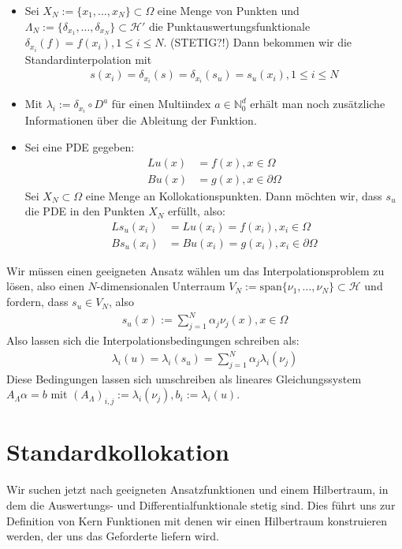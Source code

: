 \begin{example}
\begin{itemize}
\item
Sei $X_N := \{x_1, \dots, x_N\} \subset \Omega$ eine Menge von Punkten und $\Lambda_N := \{\delta_{x_1}, \dots,\delta_{x_N}\} \subset \mathcal{H}'$ die Punktauswertungsfunktionale $\delta_{x_i}(f) = f(x_i), 1\le i \le N$. (STETIG?!) Dann bekommen wir die Standardinterpolation mit
\begin{align*}
s(x_i) = \delta_{x_i}(s) = \delta_{x_i}(s_u) = s_u(x_i), 1\le i \le N
\end{align*}
\item
Mit $\lambda_i := \delta_{x_i} \circ D^a$ für einen Multiindex $a \in \mathbb{N}_0^d$ erhält man noch zusätzliche Informationen über die Ableitung der Funktion.
\item
Sei eine \ac{PDE} gegeben:
\begin{align*}
L u(x) &= f(x), x \in \Omega \\
B u(x) &= g(x), x \in \partial \Omega
\end{align*}
Sei $X_N \subset \Omega$ eine Menge an Kollokationspunkten. Dann möchten wir, dass $s_u$ die \ac{PDE} in den Punkten $X_N$ erfüllt, also:
\begin{align*}
L s_u(x_i) &= L u(x_i) = f(x_i), x_i \in \Omega \\
B s_u(x_i) &= B u(x_i) = g(x_i), x_i \in \partial \Omega
\end{align*}
\end{itemize}
\end{example}

Wir müssen einen geeigneten Ansatz wählen um das Interpolationsproblem zu lösen, also einen $N$-dimensionalen Unterraum $V_N := \text{span}\{\nu_1, \dots, \nu_N\} \subset \mathcal{H}$ und fordern, dass $s_u \in V_N$, also 
\begin{align*}
s_u(x) := \sum_{j=1}^N \alpha_j \nu_j(x), x \in \Omega
\end{align*}
Also lassen sich die Interpolationsbedingungen schreiben als:
\begin{align*}
\lambda_i(u) = \lambda_i(s_u) = \sum_{j=1}^N \alpha_j \lambda_i(\nu_j)
\end{align*}
Diese Bedingungen lassen sich umschreiben als lineares Gleichungssystem $A_\Lambda \alpha = b$ mit $(A_\Lambda)_{i,j} := \lambda_i(\nu_j), b_i := \lambda_i(u)$.

\section{Standardkollokation}
Wir suchen jetzt nach geeigneten Ansatzfunktionen und einem Hilbertraum, in dem die Auswertungs- und Differentialfunktionale stetig sind. Dies führt uns zur Definition von Kern Funktionen mit denen wir einen Hilbertraum konstruieren werden, der uns das Geforderte liefern wird.

